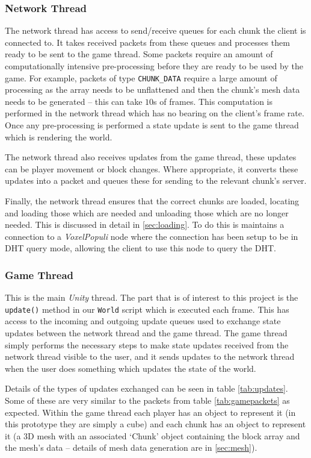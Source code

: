 \documentclass[10pt,twoside,notitlepage,a4paper]{report}
\newcommand{\unity}{\emph{Unity}}
\newcommand{\voxpop}{\emph{VoxelPopuli}}
\begin{document}
	\subsubsection{Network Thread}
	\label{sec:nthread}
	The network thread has access to send/receive queues for each chunk the client is connected to. It takes received packets from these queues and processes them ready to be sent to the game thread. Some packets require an amount of computationally intensive pre-processing before they are ready to be used by the game. For example, packets of type \texttt{CHUNK\_DATA} require a large amount of processing as the array needs to be unflattened and then the chunk's mesh data needs to be generated -- this can take $10$s of frames. This computation is performed in the network thread which has no bearing on the client's frame rate. Once any pre-processing is performed a state update is sent to the game thread which is rendering the world.
	
	The network thread also receives updates from the game thread, these updates can be player movement or block changes. Where appropriate, it converts these updates into a packet and queues these for sending to the relevant chunk's server.
	
	Finally, the network thread ensures that the correct chunks are loaded, locating and loading those which are needed and unloading those which are no longer needed. This is discussed in detail in \cref{sec:loading}. To do this is maintains a connection to a \voxpop{} node where the connection has been setup to be in DHT query mode, allowing the client to use this node to query the DHT.
	
	\subsubsection{Game Thread}
	\label{sec:gamethread}
	This is the main \unity{} thread. The part that is of interest to this project is the \texttt{update()} method in our \texttt{World} script which is executed each frame. This has access to the incoming and outgoing update queues used to exchange state updates between the network thread and the game thread. The game thread simply performs the necessary steps to make state updates received from the network thread visible to the user, and it sends updates to the network thread when the user does something which updates the state of the world.
	
	Details of the types of updates exchanged can be seen in table \ref{tab:updates}. Some of these are very similar to the packets from table \ref{tab:gamepackets} as expected. Within the game thread each player has an object to represent it (in this prototype they are simply a cube) and each chunk has an object to represent it (a 3D mesh with an associated `Chunk' object containing the block array and the mesh's data -- details of mesh data generation are in \cref{sec:mesh}).
	
\end{document}
